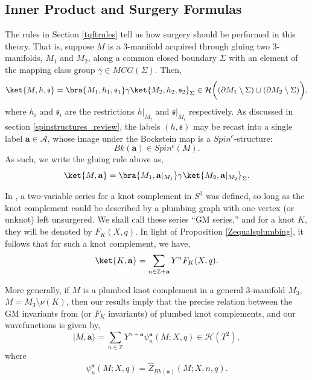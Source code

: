 \documentclass{article}
\newcommand{\Z}{{\mathbb Z}}
\renewcommand{\d}{\partial}
\numberwithin{corollary}{theorem}
\numberwithin{corollary}{proposition}
\begin{document}



\subsection{Inner Product and Surgery Formulas}
The rules in Section \ref{tqftrules} tell us how surgery should be performed in this theory. That is, suppose $M$ is a 3-manifold acquired through gluing two 3-manifolds, $M_1$ and $M_2$, along a common closed boundary $\Sigma$ with an element of the mapping class group $\gamma \in MCG(\Sigma)$. Then, 
$$\ket{M,h,\mathfrak{s}} = \bra{M_1,h_1,\mathfrak{s}_1}\gamma\ket{M_2,h_2,\mathfrak{s}_2}_\Sigma \in \mathcal{H}\bigg((\d M_1 \setminus \Sigma) \sqcup (\d M_2 \setminus \Sigma)\bigg),$$
where $h_i$ and $\mathfrak{s}_i$ are the restrictions $h\vert_{M_i}$ and $\mathfrak{s}\vert_{M_i}$ respectively. As discussed in section \ref{spinstructures_review}, the labels $(h,\mathfrak{s})$ may be recast into a single label $\mathbf{a}\in \mathcal{A}$, whose image under the Bockstein map is a $Spin^c$-structure:
$$Bk(\mathbf{a}) \in Spin^c(M).$$
As such, we write the gluing rule above as,
$$\ket{M,\mathbf{a}} = \bra{M_1,\mathbf{a}\vert _{M_1}}\gamma\ket{M_2,\mathbf{a}\vert _{M_2}}_\Sigma.$$

In \cite{GM}, a two-variable series for a knot complement in $S^3$ was defined, so long as the knot complement could be described by a plumbing graph with one vertex (or unknot) left unsurgered. We shall call these series ``GM series,'' and for a knot $K$, they will be denoted by $F_K(X,q)$. In light of Proposition \ref{Zequalsplumbing}, it follows that for such a knot complement, we have, 
$$\ket{K,\mathbf{a}} = \sum_{n\in \Z +\mathbf{a}}Y^n F_K(X,q).$$

More generally, if $M$ is a plumbed knot complement in a general 3-manifold $M_3$, $M = M_3 \setminus \nu(K)$, then our results imply that the precise relation between the GM invariants from \cite{GM} (or $F_K$ invariants) of plumbed knot complements, and our wavefunctions is given by, 
$$|M,\mathbf{a} \rangle = \sum_{n\in \mathbb{Z}} Y^{n+\mathbf{a}} \psi^{\mathbf{a}}_{n}(M;X,q) \in \mathcal{H}(T^2),$$
where
$$\psi^{\mathbf{a}}_{n}(M;X,q) = \hat{Z}_{Bk(\mathbf{a})}  (M;X,n,q).$$
\end{document}
